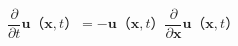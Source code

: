 \documentclass[a4j,12pt]{jreport}
\begin{document}


\begin{equation}\label{eq:uncalculated_pressure_before}
\frac{\partial}{\partial t}\bm{u} （\bm{x},t）  = -\bm{u} （\bm{x},t） \frac{\partial}{\partial \bm{x}}\bm{u} （\bm{x},t）
\end{equation} 

            

\end{document}
